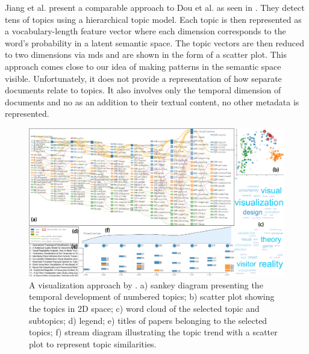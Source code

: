 Jiang et al. \cite{Jiang2016} present a comparable approach to Dou et al. as seen in \cite{fig:jiang}.
They detect tens of topics using a hierarchical topic model.
Each topic is then represented as a vocabulary-length feature vector where each dimension corresponds to the word's probability in a latent semantic space.
The topic vectors are then reduced to two dimensions via \gls{mds} and are shown in the form of a scatter plot.
This approach comes close to our idea of making patterns in the semantic space visible.
Unfortunately, it does not provide a representation of how separate documents relate to topics.
It also involves only the temporal dimension of documents and no as an addition to their textual content, no other metadata is represented.

\begin{figure}
\includegraphics[width=\textwidth]{img/jiang}
\caption{A visualization approach by \cite{Jiang2016}. a) sankey diagram presenting the temporal development of numbered topics; b) scatter plot showing the topics in 2D space; c) word cloud of the selected topic and subtopics;  d) legend; e) titles of papers belonging to the selected topics; f) stream diagram illustrating the topic trend with a scatter plot to represent topic similarities. }
\label{fig:jiang}
\end{figure}

